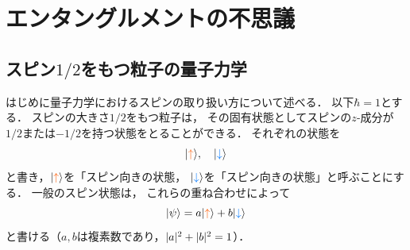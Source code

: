 \documentclass[
]{sotsu}
\newcommand{\bitone}{\mathcolor{fire}{\uparrow}}
\newcommand{\bittwo}{\mathcolor{water}{\downarrow}}
\let\upspin\bitone
\let\dwspin\bittwo
\begin{document}
\section{エンタングルメントの不思議}


\subsection{スピン\texorpdfstring{$1/2$}{½}をもつ粒子の量子力学}

はじめに量子力学におけるスピンの取り扱い方について述べる．
以下$\hbar = 1$とする．
スピンの大きさ$1/2$をもつ粒子は，
その固有状態としてスピンの$z$-成分が$1/2$または$-1/2$を持つ状態をとることができる．
それぞれの状態を
\begin{equation}
    \label{eq:spin-basis}
    \ket{\upspin}, \quad \ket{\dwspin}
\end{equation}
と書き，$\ket{\upspin}$を「スピン向きの状態，
$\ket{\dwspin}$を「スピン向きの状態」と呼ぶことにする．
一般のスピン状態は，
これらの重ね合わせによって
\begin{equation}
    \label{eq:spin-state}
    \ket{\psi} = a \ket{\upspin} + b \ket{\dwspin}
\end{equation}
と書ける（$a, b$は複素数であり，$\lvert a\rvert^2 + \lvert b\rvert^2 = 1$）．
\end{document}
